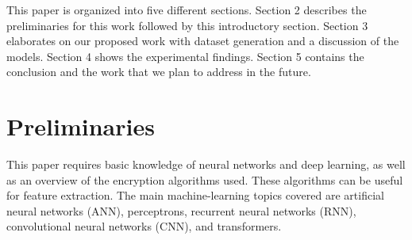 \documentclass[runningheads]{llncs}
\begin{document}
This paper is organized into five different sections. Section 2 describes the preliminaries for this work followed by this introductory section. Section 3 elaborates on our proposed work with dataset generation and a discussion of the models. Section 4 shows the experimental findings. Section 5 contains the conclusion and the work that we plan to address in the future.


\section{Preliminaries}
This paper requires basic knowledge of neural networks and deep learning, as well as an overview of the encryption algorithms used. These algorithms can be useful for feature extraction. The main machine-learning topics covered are artificial neural networks (ANN), perceptrons, recurrent neural networks (RNN), convolutional neural networks (CNN), and transformers.
\end{document}
